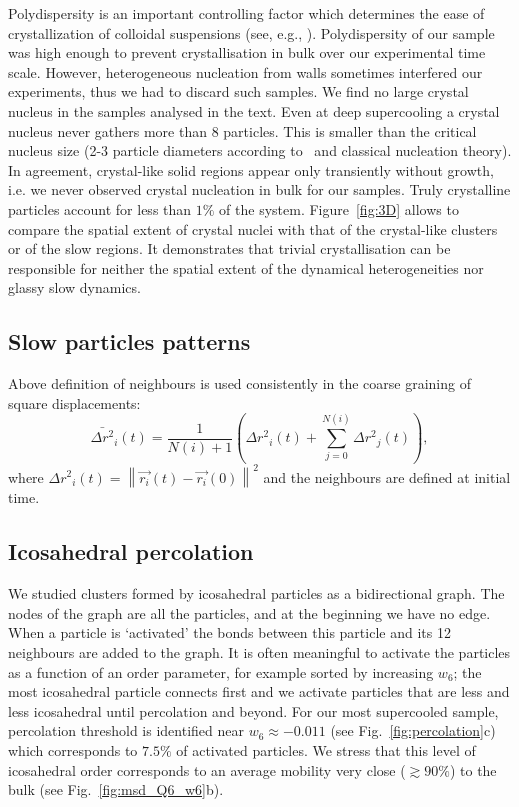Polydispersity is an important controlling factor which determines the ease of crystallization of colloidal suspensions (see, e.g., \cite{Zaccarelli2009}). 
Polydispersity of our sample was high enough to prevent crystallisation in bulk over our experimental time scale. 
However, heterogeneous nucleation from walls sometimes interfered our experiments, thus we had to discard such samples. 
We find no large crystal nucleus in the samples analysed in the text. Even at deep supercooling a crystal nucleus never gathers more than 8 particles. This is smaller than the critical nucleus size (2-3 particle diameters according to~\cite{Auer2001} and classical nucleation theory). In agreement, crystal-like solid regions appear only transiently without growth, i.e. we never observed crystal nucleation in bulk for our samples. Truly crystalline particles account for less than $1\%$ of the system. Figure~\ref{fig:3D} allows to compare the spatial extent of crystal nuclei with that of the crystal-like clusters or of the slow regions. It demonstrates that trivial crystallisation can be responsible for neither the spatial extent of the dynamical heterogeneities nor glassy slow dynamics.

\subsection*{Slow particles patterns}

Above definition of neighbours is used consistently in the coarse graining of square displacements:
\begin{equation}
	\bar{\Delta r^2}_i(t) = \frac{1}{N(i)+1}\left( {\Delta r^2}_i(t) + \sum_{j=0}^{N(i)} {\Delta r^2}_j(t) \right),
	\label{eq:Mu}
\end{equation}
where ${\Delta r^2}_i(t) = \left\|\vec{r_i}(t)-\vec{r_i}(0)\right\|^2$ and the neighbours are defined at initial time. 

\subsection*{Icosahedral percolation}

We studied clusters formed by icosahedral particles as a bidirectional graph. The nodes of the graph are all the particles, and at the beginning we have no edge. When a particle is `activated' the bonds between this particle and its 12 neighbours are added to the graph. It is often meaningful to activate the particles as a function of an order parameter, for example sorted by increasing $w_6$; the most icosahedral particle connects first and we activate particles that are less and less icosahedral until percolation and beyond. For our most supercooled sample, percolation threshold is identified near $w_6\approx -0.011$ (see Fig.~\ref{fig:percolation}c) which corresponds to $7.5\%$ of activated particles. We stress that this level of icosahedral order corresponds to an average mobility very close ($\gtrsim 90\%$) to the bulk (see Fig.~\ref{fig:msd_Q6_w6}b).

